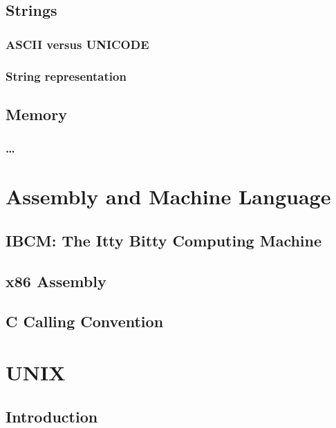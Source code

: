 \documentclass[11pt,twoside]{book}
\begin{document}
\chapter{Strings}

\section{ASCII versus UNICODE}

\section{String representation}


\chapter{Memory}

\section{\ldots}

\part{Assembly and Machine Language}

\chapter{IBCM: The Itty Bitty Computing Machine}



\chapter{x86 Assembly}



\chapter{C Calling Convention}




\part{UNIX}

\chapter{Introduction}
\end{document}
